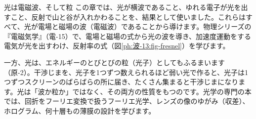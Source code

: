 \begin{phsaki}{光は電磁波、そして粒}
この章では、光が横波であること、ゆれる電子が光を出すこと、反射で山と谷が入れかわることを、結果として使いました。これらはすべて、光が電場と磁場の波（電磁波）であることから導けます。物理シリーズの『電磁気学』（電-15）で、電場と磁場の式から光の波を導き、加速度運動をする電気が光を出すわけ、反射率の式（図\ref{ph:波-13:fig-fresnel}）を学びます。

一方、光は、エネルギーのとびとびの粒（光子）としてもふるまいます（原-2）。干渉じまを、光子を1つずつ数えられるほど弱い光で作ると、光子は1つずつスクリーンのばらばらの所に届き、たくさん集まると干渉じまになります。光は「波か粒か」ではなく、その両方の性質をもつのです。光学の専門の本では、回折をフーリエ変換で扱うフーリエ光学、レンズの像のゆがみ（収差）、ホログラム、何十層もの薄膜の設計を学びます。
\end{phsaki}

